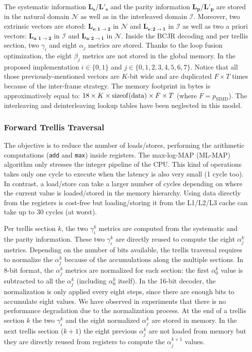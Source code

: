 The systematic information $\bm{L_s}$/$\bm{L'_s}$ and the parity information
$\bm{L_p}$/$\bm{L'_p}$ are stored in the natural domain $\mathcal{N}$ as well as
in the interleaved domain $\mathcal{I}$. Moreover, two extrinsic vectors are
stored: $\bm{L_{e:1 \rightarrow 2}}$ in $\mathcal{N}$ and
$\bm{L_{e:2 \rightarrow 1}}$ in $\mathcal{I}$ as well as two a priori vectors:
$\bm{L_{a:1 \rightarrow 2}}$ in $\mathcal{I}$ and
$\bm{L_{a:2 \rightarrow 1}}$ in $\mathcal{N}$. Inside the BCJR decoding and per
trellis section, two $\gamma_{i}$ and eight $\alpha_{j}$ metrics are stored.
Thanks to the loop fusion optimization, the eight $\beta_j$ metrics are not
stored in the global memory. In the proposed implementation $i \in \{0,1\}$ and
$j \in \{0,1,2,3,4,5,6,7\}$. Notice that all those previously-mentioned vectors
are $K$-bit wide and are duplicated $F\times T$ times because of the inter-frame
strategy. The memory footprint in bytes is approximatively equal to:
$18 \times K \times \operatorname*{sizeof}(\text{data}) \times F \times T$ (where
$F = p_\text{SIMD}$). The interleaving and deinterleaving lookup tables have
been neglected in this model.

\subsubsection{Forward Trellis Traversal}

The objective is to reduce the number of loads/stores, performing the arithmetic
computations (\verb|add| and \verb|max|) inside registers. The max-log-MAP
(ML-MAP) algorithm only stresses the integer pipeline of the CPU. This kind of
operations takes only one cycle to execute when the latency is also very small
(1 cycle too). In contrast, a load/store can take a larger number of cycles
depending on where the current value is loaded/stored in the memory hierarchy.
Using data directly from the registers is cost-free but loading/storing it from
the L1/L2/L3 cache can take up to 30 cycles (at worst).

Per trellis section $k$, the two $\gamma_i^k$ metrics are computed from the
systematic and the parity information. These two $\gamma_i^k$ are directly
reused to compute the eight $\alpha_j^k$ metrics. Depending on the number of
bits available, the trellis traversal requires to normalize the $\alpha_j^k$
because of the accumulations along the multiple sections.  In 8-bit format, the
$\alpha_j^k$ metrics are normalized for each section: the first $\alpha_0^k$
value is subtracted to all the $\alpha_j^k$ (including $\alpha_0^k$ itself). In
the 16-bit decoder, the normalization is only applied every eight steps, since
there are enough bits to accumulate eight values. We have observed in
experiments that there is no performance degradation due to the normalization
process. At the end of a trellis section $k$ the two $\gamma_i^k$ and the eight
normalized $\alpha_j^k$ are stored in  memory. In the next trellis section
($k+1$) the eight previous $\alpha_j^k$ are not loaded from memory but they are
directly reused from registers to compute the $\alpha_j^{k+1}$ values.

